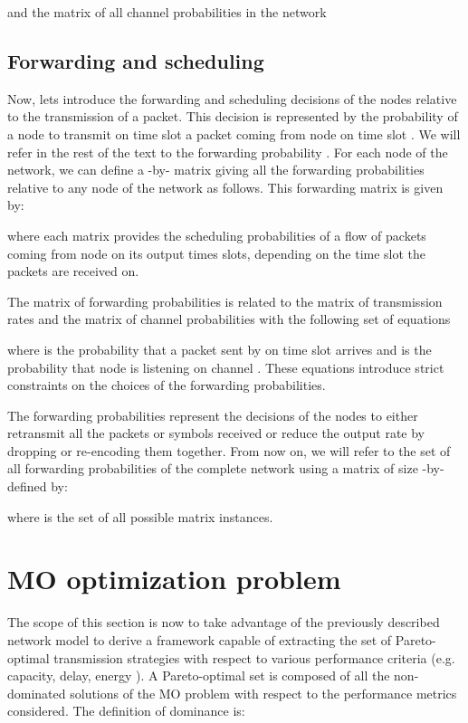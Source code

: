\documentclass[a4paper]{article}
\begin{document}
and  the matrix of all channel probabilities in the network 







\subsection{Forwarding and scheduling}

Now, lets introduce the forwarding and scheduling decisions of the nodes relative to the transmission of a packet. This decision is represented by the probability  of a node  to transmit on time slot  a packet coming from node  on time slot . We will refer in the rest of the text to the forwarding probability  . 
For each node of the network, we can define a -by- matrix giving all the forwarding probabilities relative to any node  of the network as follows. This forwarding matrix  is given by:


where each matrix   provides the scheduling probabilities of a flow of packets coming from node  on its output times slots, depending on the time slot the packets are received on.


The matrix of forwarding probabilities is related to the matrix of transmission rates  and the matrix of channel probabilities  with the following set of  equations

\noindent where  is the probability that a packet sent by  on time slot  arrives and  is the probability that node  is listening on channel . These equations introduce strict constraints on the choices of the forwarding probabilities. 

The forwarding probabilities represent the decisions of the nodes to either  retransmit all the packets or symbols received or  reduce the output rate by dropping or re-encoding them together. 
From now on, we will refer to the set of all forwarding probabilities of the complete network using a matrix  of size -by- defined by:


\noindent where  is the set of all possible matrix instances.







\section{MO optimization problem}\label{sec:problemstatement}

The scope of this section is now to take advantage of the previously described network model to derive a framework capable of extracting the set of Pareto-optimal transmission strategies with respect to various performance criteria (e.g. capacity, delay, energy ).
A Pareto-optimal set is composed of all the non-dominated solutions of the MO problem with respect to the performance metrics considered. The definition of dominance is:
\end{document}
